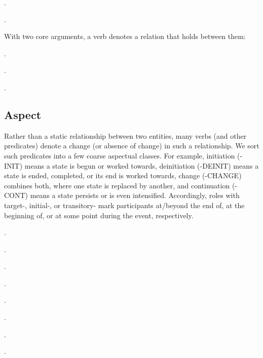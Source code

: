 \documentclass[a4paper]{article}
\newcommand{\fr}[1]{\textsf{#1}}
\newcommand{\rl}[1]{\textsf{#1}}
\begin{document}
\ex.

\ex.

With two core arguments, a verb denotes a relation that holds between them:

\ex.

\ex.

\ex.

\subsection{Aspect}

Rather than a static relationship between two entities, many verbs (and other
predicates) denote a change (or absence of change) in such a relationship. We
sort such predicates into a few coarse aspectual classes. For example,
initiation (\fr{-INIT}) means a state is begun or worked towards, deinitiation
(\fr{-DEINIT}) means a state is ended, completed, or its end is worked towards,
change (\fr{-CHANGE}) combines both, where one state is replaced by another,
and continuation (\fr{-CONT}) means a state persists or is even intensified.
Accordingly, roles with \rl{target-}, \rl{initial-}, or \rl{transitory-} mark
participants at/beyond the end of, at the beginning of, or at some point during
the event, respectively.

\ex.

\ex.

\ex.

\ex.

\ex.

\ex.\label{ex:fall}

\ex.

\ex.
\end{document}
